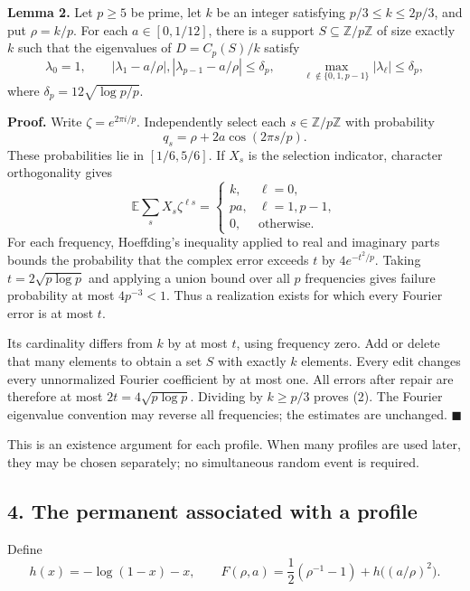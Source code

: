 \documentclass[
  11pt,
]{article}
\begin{document}
\textbf{Lemma 2.} Let \(p\ge5\) be prime, let \(k\) be an integer
satisfying \(p/3\le k\le2p/3\), and put \(\rho=k/p\). For each
\(a\in[0,1/12]\), there is a support \(S\subseteq\mathbb Z/p\mathbb Z\)
of size exactly \(k\) such that the eigenvalues of \(D=C_p(S)/k\)
satisfy \[
 \lambda_0=1,\qquad
 |\lambda_1-a/\rho|,|\lambda_{p-1}-a/\rho|\le\delta_p,
 \qquad
 \max_{\ell\notin\{0,1,p-1\}}|\lambda_\ell|\le\delta_p,       \tag{2}
\] where \(\delta_p=12\sqrt{\log p/p}\).

\textbf{Proof.} Write \(\zeta=e^{2\pi i/p}\). Independently select each
\(s\in\mathbb Z/p\mathbb Z\) with probability \[
 q_s=\rho+2a\cos(2\pi s/p).
\] These probabilities lie in \([1/6,5/6]\). If \(X_s\) is the selection
indicator, character orthogonality gives \[
 \mathbb E\sum_sX_s\zeta^{\ell s}
 =\begin{cases}
 k,&\ell=0,\\
 pa,&\ell=1,p-1,\\
 0,&\text{otherwise}.
 \end{cases}                                                   \tag{3}
\] For each frequency, Hoeffding's inequality applied to real and
imaginary parts bounds the probability that the complex error exceeds
\(t\) by \(4e^{-t^2/p}\). Taking \(t=2\sqrt{p\log p}\) and applying a
union bound over all \(p\) frequencies gives failure probability at most
\(4p^{-3}<1\). Thus a realization exists for which every Fourier error
is at most \(t\).

Its cardinality differs from \(k\) by at most \(t\), using frequency
zero. Add or delete that many elements to obtain a set \(S\) with
exactly \(k\) elements. Every edit changes every unnormalized Fourier
coefficient by at most one. All errors after repair are therefore at
most \(2t=4\sqrt{p\log p}\). Dividing by \(k\ge p/3\) proves (2). The
Fourier eigenvalue convention may reverse all frequencies; the estimates
are unchanged. \(\blacksquare\)

This is an existence argument for each profile. When many profiles are
used later, they may be chosen separately; no simultaneous random event
is required.

\subsection{4. The permanent associated with a
profile}\label{the-permanent-associated-with-a-profile}

Define \[
 h(x)=-\log(1-x)-x,
 \qquad
 F(\rho,a)=\frac12(\rho^{-1}-1)+h\bigl((a/\rho)^2\bigr).
\]
\end{document}
